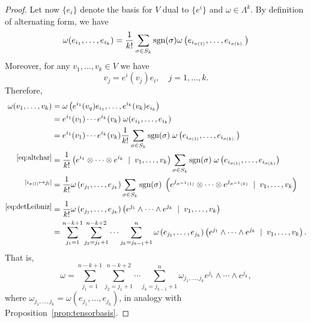 \begin{proof}
	Let now $\{e_i\}$ denote the basis for $V$ dual to $\{e^i\}$ and $\omega\in\Lambda^k$.
	By definition of alternating form, we have
	\begin{equation}\label{eq:altchar}
		\omega(e_{i_1}, \ldots, e_{i_k}) = \frac1{k!} \sum_{\sigma\in S_k}\operatorname{sgn}(\sigma) \omega\left(e_{i_{\sigma(1)}}, \ldots, e_{i_{\sigma(k).}}\right)
	\end{equation}
	Moreover, for any $v_1,\ldots,v_k\in V$ we have
	\begin{equation}
		v_j = e^i(v_j) e_i, \quad j=1,\ldots, k.
	\end{equation}
	Therefore,
	\begin{align}
		\omega(v_1, \ldots, v_k)
		 & =\omega\left(e^{i_1}(v_q) e_{i_1}, \ldots, e^{i_k}(v_k) e_{i_k}\right)                                                                                                                                  \\
		 & =e^{i_1}(v_1)\cdots e^{i_k}(v_k)\; \omega(e_{i_1}, \ldots, e_{i_k})                                                                                                                                     \\
		 & =e^{i_1}(v_1)\cdots e^{i_k}(v_k) \frac1{k!} \sum_{\sigma\in S_k}\operatorname{sgn}(\sigma)\; \omega\left(e_{i_{\sigma(1)}}, \ldots, e_{i_{\sigma(k).}}\right)                                                         \\
		\overset{\mbox{\small\eqref{eq:altchar}}}{}
		 & = \frac1{k!} \left(e^{i_1}\otimes \cdots \otimes e^{i_k} \;\mid\; v_1, \ldots, v_k\right) \sum_{\sigma\in S_k}\operatorname{sgn}(\sigma)\; \omega\left(e_{i_{\sigma(1)}}, \ldots, e_{i_{\sigma(k)}}\right)            \\
		\overset{[i_{\sigma(l)} \mapsto j_l]}{}
		 & = \frac1{k!} \omega\left(e_{j_1}, \ldots, e_{j_k}\right) \sum_{\sigma\in S_k} \operatorname{sgn}(\sigma) \;\left(e^{j_{\sigma^{-1}(1)}}\otimes \cdots \otimes e^{j_{\sigma^{-1}(k)}} \;\mid\; v_1, \ldots, v_k\right) \\
		\overset{\mbox{\small\eqref{eq:detLeibniz}}}{}
		 & = \frac1{k!} \omega\left(e_{j_1}, \ldots, e_{j_k}\right) \left( e^{j_1}\wedge \cdots \wedge e^{j_k} \;\mid\; v_1, \ldots, v_k\right)                                                                    \\
		 & = \sum_{j_1=1}^{n-k+1}\sum_{j_2=j_1+1}^{n-k+2}\cdots \sum_{j_k=j_{k-1}+1}^{n} \omega\left(e_{j_1}, \ldots, e_{j_k}\right) \left(e^{j_1}\wedge \cdots \wedge e^{j_k} \;\mid\; v_1, \ldots, v_k\right).
	\end{align}
	That is,
	\begin{equation}
		\omega = \sum_{j_1=1}^{n-k+1}\sum_{j_2=j_1+1}^{n-k+2}\cdots \sum_{j_k=j_{k-1}+1}^{n} \omega_{j_1, \ldots, j_k} e^{j_1}\wedge \cdots \wedge e^{j_k},
	\end{equation}
	where $\omega_{j_1, \ldots, j_k} = \omega\left(e_{j_1}, \ldots, e_{j_k}\right)$, in analogy with Proposition~\ref{prop:tensorbasis}.
\end{proof}

